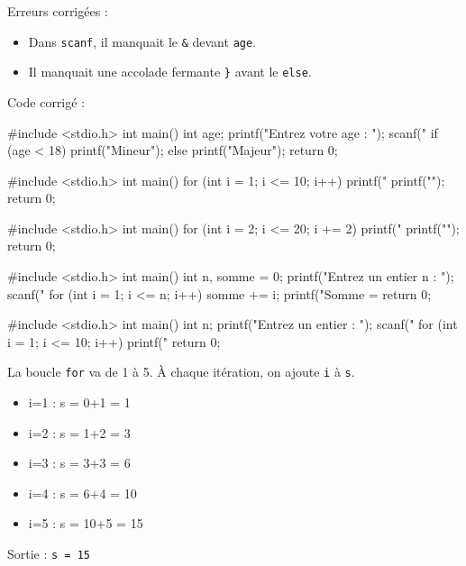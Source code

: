 Erreurs corrigées :
\begin{itemize}
    \item Dans \texttt{scanf}, il manquait le \texttt{\&} devant \texttt{age}.
    \item Il manquait une accolade fermante \texttt{\}} avant le \texttt{else}.
\end{itemize}
Code corrigé :
\begin{ccode}
#include <stdio.h>
int main() {
    int age;
    printf("Entrez votre age : ");
    scanf("%
    if (age < 18) {
        printf("Mineur\n");
    } else {
        printf("Majeur\n");
    }
    return 0;
}
\end{ccode}

\begin{ccode}
#include <stdio.h>
int main() {
    for (int i = 1; i <= 10; i++) {
        printf("%
    }
    printf("\n");
    return 0;
}
\end{ccode}

\begin{ccode}
#include <stdio.h>
int main() {
    for (int i = 2; i <= 20; i += 2) {
        printf("%
    }
    printf("\n");
    return 0;
}
\end{ccode}

\begin{ccode}
#include <stdio.h>
int main() {
    int n, somme = 0;
    printf("Entrez un entier n : ");
    scanf("%
    for (int i = 1; i <= n; i++) {
        somme += i;
    }
    printf("Somme = %
    return 0;
}
\end{ccode}

\begin{ccode}
#include <stdio.h>
int main() {
    int n;
    printf("Entrez un entier : ");
    scanf("%
    for (int i = 1; i <= 10; i++) {
        printf("%
    }
    return 0;
}
\end{ccode}

La boucle \texttt{for} va de 1 à 5. À chaque itération, on ajoute \texttt{i} à \texttt{s}.
\begin{itemize}
    \item i=1 : s = 0+1 = 1
    \item i=2 : s = 1+2 = 3
    \item i=3 : s = 3+3 = 6
    \item i=4 : s = 6+4 = 10
    \item i=5 : s = 10+5 = 15
\end{itemize}
Sortie : \texttt{s = 15}

